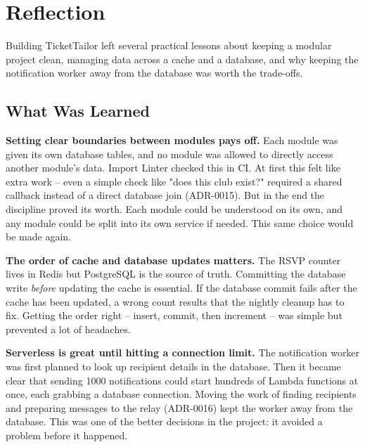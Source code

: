 \section{Reflection}
\label{sec:reflection}

Building TicketTailor left several practical lessons about keeping a modular project clean, managing data across a cache and a database, and why keeping the notification worker away from the database was worth the trade-offs.

\subsection{What Was Learned}

\textbf{Setting clear boundaries between modules pays off.} Each module was given its own database tables, and no module was allowed to directly access another module's data. Import Linter checked this in CI. At first this felt like extra work -- even a simple check like "does this club exist?" required a shared callback instead of a direct database join (ADR-0015). But in the end the discipline proved its worth. Each module could be understood on its own, and any module could be split into its own service if needed. This same choice would be made again.

\textbf{The order of cache and database updates matters.} The RSVP counter lives in Redis but PostgreSQL is the source of truth. Committing the database write \textit{before} updating the cache is essential. If the database commit fails after the cache has been updated, a wrong count results that the nightly cleanup has to fix. Getting the order right -- insert, commit, then increment -- was simple but prevented a lot of headaches.

\textbf{Serverless is great until hitting a connection limit.} The notification worker was first planned to look up recipient details in the database. Then it became clear that sending 1000 notifications could start hundreds of Lambda functions at once, each grabbing a database connection. Moving the work of finding recipients and preparing messages to the relay (ADR-0016) kept the worker away from the database. This was one of the better decisions in the project: it avoided a problem before it happened.

